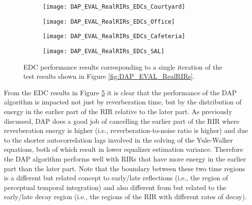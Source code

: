 \begin{figure}[H]
	\centering
	\begin{subfigure}[b]{0.49\textwidth}
		\centering
		\texttt{[image: DAP\_EVAL\_RealRIRs\_EDCs\_Courtyard]}
		\label{subfig:DAP_EVAL_RealRIRs_EDCs_Courtyard}
	\end{subfigure}
	\begin{subfigure}[b]{0.49\textwidth}
		\centering
		\texttt{[image: DAP\_EVAL\_RealRIRs\_EDCs\_Office]}
		\label{subfig:DAP_EVAL_RealRIRs_EDCs_Office}
	\end{subfigure}
	\begin{subfigure}[b]{0.49\textwidth}
		\centering
		\texttt{[image: DAP\_EVAL\_RealRIRs\_EDCs\_Cafeteria]}
		\label{subfig:DAP_EVAL_RealRIRs_EDCs_Cafeteria}
	\end{subfigure}
	\begin{subfigure}[b]{0.49\textwidth}
		\centering
		\texttt{[image: DAP\_EVAL\_RealRIRs\_EDCs\_SAL]}
		\label{subfig:DAP_EVAL_RealRIRs_EDCs_SAL}
	\end{subfigure}
	\caption[EDC performance from DAP evaluation for several real RIR measurements]{EDC performance results corresponding to a single iteration of the test results shown in Figure \ref{fig:DAP_EVAL_RealRIRs}.}
	\label{fig:DAP_EVAL_RealRIRs_EDCs}
\end{figure}


From the EDC results in Figure \ref{fig:DAP_EVAL_RealRIRs_EDCs} it is clear that the performance of the DAP algorithm is impacted not just by reverberation time, but by the distribution of energy in the earlier part of the RIR relative to the later part. As previously discussed, DAP does a good job of cancelling the earlier part of the RIR where reverberation energy is higher (i.e., reverberation-to-noise ratio is higher) and due to the shorter autocorrelation lags involved in the solving of the Yule-Walker equations, both of which result in lower equalizer estimation variance. Therefore the DAP algorithm performs well with RIRs that have more energy in the earlier part than the later part. Note that the boundary between these two time regions is a different but related concept to early/late reflections (i.e., the region of perceptual temporal integration) and also different from but related to the early/late decay region (i.e., the regions of the RIR with different rates of decay). 

